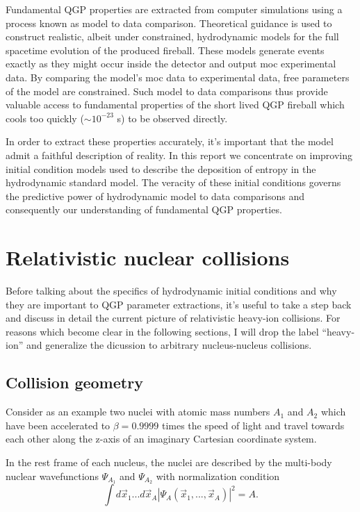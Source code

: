 \documentclass[aps,prc,reprint,amsmath,nofootinbib]{revtex4-1}
\begin{document}
Fundamental QGP properties are extracted from computer simulations using a process known as model to data comparison. Theoretical guidance is used to construct
realistic, albeit under constrained, hydrodynamic models for the full spacetime evolution of the produced fireball. These models generate events exactly as they might
occur inside the detector and output moc experimental data. By comparing the model's moc data to experimental data, free parameters of the model are constrained. Such 
model to data comparisons thus provide valuable access to fundamental properties of the short lived QGP fireball which cools too quickly (${\sim}10^{-23}$ s) to be 
observed directly.

In order to extract these properties accurately, it's important that the model admit a faithful description of reality. In this report we concentrate on improving 
initial condition models used to describe the deposition of entropy in the hydrodynamic standard model. The veracity of these initial conditions governs the 
predictive power of hydrodynamic model to data comparisons and consequently our understanding of fundamental QGP properties.
  
\section{Relativistic nuclear collisions}

Before talking about the specifics of hydrodynamic initial conditions and why they are important to QGP parameter extractions, it's useful to take a step back 
and discuss in detail the current picture of relativistic heavy-ion collisions. For reasons which become clear in the following sections, I will drop the 
label ``heavy-ion'' and generalize the dicussion to arbitrary nucleus-nucleus collisions.

\subsection{Collision geometry}

Consider as an example two nuclei with atomic mass numbers $A_1$ and $A_2$ which have been accelerated to $\beta=0.9999$ times the speed of light and travel towards
each other along the z-axis of an imaginary Cartesian coordinate system.

In the rest frame of each nucleus, the nuclei are described by the multi-body nuclear wavefunctions $\Psi_{A_1}$ and $\Psi_{A_2}$ with normalization condition  
\begin{equation}
\int d\vec{x}_1 ... d\vec{x}_A \left | \Psi_A(\vec{x}_1,...,\vec{x}_A) \right|^2 = A.
\end{equation}
\end{document}
